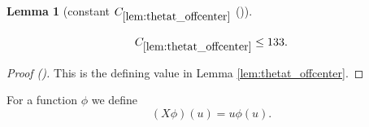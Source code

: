 \documentclass[12pt,reqno]{amsart}
\newcommand{\auto}{{({\tiny\faCar})}}
\theoremstyle{plain}
\newtheorem{lemma}[theorem]{Lemma}
\numberwithin{equation}{section}
\theoremstyle{remark}
\newcommand{\uses}[1]{}
\newcommand{\usesdefs}[1]{}
\newcommand{\leanok}{}
\newcommand{\lean}[1]{}
\begin{document}
\begin{lemma}[constant $C_{\ref{lem:thetat_offcenter}}$ \auto]\label{constant off center bump}\uses{lem:thetat_offcenter}\usesdefs{}
\lean{Auto.constantOffCenterBump}
\leanok
\begin{equation}\label{constant off center bump bound}
C_{\ref{lem:thetat_offcenter}}\le133.
\end{equation}
\end{lemma}
\begin{proof}[Proof \auto]
This is the defining value in Lemma \ref{lem:thetat_offcenter}.
\end{proof}


For a function $\phi$ we define
\begin{equation}\label{auto:multiplication-operator-X}(X\phi)(u) = u\phi(u).\end{equation}
\end{document}
